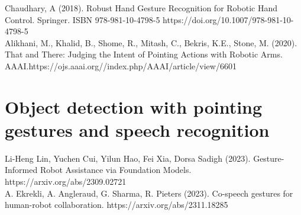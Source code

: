 Chaudhary, A (2018). Robust Hand Gesture Recognition for Robotic Hand Control. Springer. ISBN 978-981-10-4798-5 https://doi.org/10.1007/978-981-10-4798-5\\

Alikhani, M., Khalid, B., Shome, R., Mitash, C., Bekris, K.E., Stone, M. (2020). That and There: Judging the Intent of Pointing Actions with Robotic Arms. AAAI.https://ojs.aaai.org//index.php/AAAI/article/view/6601\\

\section{Object detection with pointing gestures and speech recognition}
Li-Heng Lin, Yuchen Cui, Yilun Hao, Fei Xia, Dorsa Sadigh (2023). Gesture-Informed Robot Assistance via Foundation Models. https://arxiv.org/abs/2309.02721 \\

A. Ekrekli, A. Angleraud, G. Sharma, R. Pieters (2023). Co-speech gestures for human-robot collaboration. https://arxiv.org/abs/2311.18285 \\



% 

% 

% 
%


